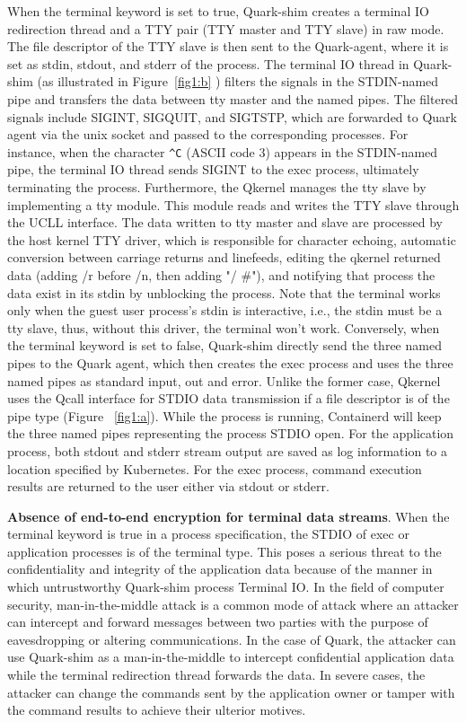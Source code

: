 When the terminal keyword is set to true, Quark-shim creates a terminal IO redirection thread and a TTY pair (TTY master and TTY slave) in raw mode. The file descriptor of the TTY slave is then sent to the Quark-agent, where it is set as stdin, 
stdout, and stderr of the process. The terminal IO thread in Quark-shim (as illustrated in Figure~\ref{fig1:b} ) filters the signals in the STDIN-named pipe and transfers the data between tty master and the named pipes. The filtered signals include SIGINT, 
SIGQUIT, and SIGTSTP, which are forwarded to Quark agent via the unix socket and passed to the corresponding processes. For instance, when the character \verb|^C| (ASCII code 3) appears in the STDIN-named pipe, the terminal IO thread sends SIGINT to 
the exec process, ultimately terminating the process. Furthermore, the Qkernel manages the tty slave by implementing a tty module. This module reads and writes the TTY slave through the UCLL interface. The data written to tty master and 
slave are processed by the host kernel TTY driver, which is responsible for character echoing, automatic conversion between carriage returns and linefeeds, editing the qkernel returned data (adding /r before /n, then adding "/ \#"), and 
notifying that process the data exist in its stdin by unblocking the process. Note that the terminal works only when the guest user process's stdin is interactive, i.e., the stdin must be a tty slave, thus, without this driver, the terminal won’t work. Conversely, when the terminal keyword is set to false, 
Quark-shim directly send the three named pipes to the Quark agent, which then creates the exec process and uses the three named pipes as standard input, out and error. Unlike the former case, Qkernel uses the Qcall interface for STDIO data 
transmission if a file descriptor is of the pipe type (Figure ~\ref{fig1:a}). While the process is running, Containerd will keep the three named pipes representing the process STDIO open. For the application process, both stdout and stderr stream 
output are saved as log information to a location specified by Kubernetes. For the exec process, command execution results are returned to the user either via stdout or stderr.


\textbf{Absence of end-to-end encryption for terminal data streams}. When the terminal keyword is true in a process specification, the STDIO of exec or application processes is of the terminal type. This poses a serious threat to the confidentiality and 
integrity of the application data because of the manner in which untrustworthy Quark-shim process Terminal IO. In the field of computer security, man-in-the-middle attack\cite*{Man_in_the_middle_attack} is a common mode of attack where an attacker can intercept and forward 
messages between two parties with the purpose of eavesdropping or altering communications. In the case of Quark, the attacker can use Quark-shim as a man-in-the-middle to intercept confidential application data while the terminal redirection 
thread forwards the data. In severe cases, the attacker can change the commands sent by the application owner or tamper with the command results to achieve their ulterior motives.


